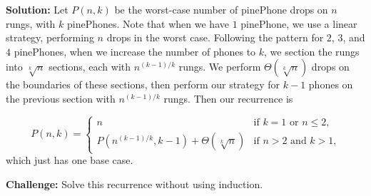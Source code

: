 \documentclass[letterpaper,11pt]{article}
\begin{document}
\begin{enumerate}
\begin{enumerate}
\textbf{Solution:} Let $P(n,k)$ be the worst-case number of pinePhone drops on $n$ rungs, with $k$ pinePhones. Note that when we have $1$ pinePhone, we use a linear strategy, performing $n$ drops in the worst case. Following the pattern for $2$, $3$, and $4$ pinePhones, when we increase the number of phones to $k$, we section the rungs into $\sqrt[k]{n}$ sections, each with $n^{(k-1)/k}$ rungs. We perform $\Theta(\sqrt[k]{n})$ drops on the boundaries of these sections, then perform our strategy for $k-1$ phones on the previous section with $n^{(k-1)/k}$ rungs. Then our recurrence is

\[P(n,k)=\begin{cases}
n&\text{if $k=1$ or $n\leq 2$,}\\
P(n^{(k-1)/k},k-1) + \Theta(\sqrt[k]{n})&\text{if $n>2$ and $k> 1$,}
\end{cases}\]
which just has one base case.
\end{enumerate}

{\bf Challenge:} Solve this recurrence without using induction.

\end{enumerate}
\end{document}

